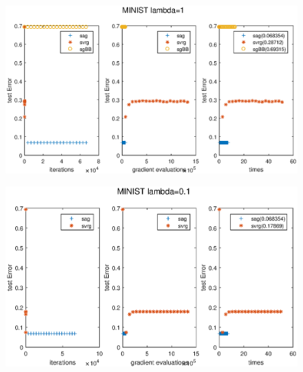 \documentclass[UTF8]{ctexart}
\begin{document}
\begin{figure}[htbp]
\centering\includegraphics[width=5in]{1-1-b.eps}
\label{fig:1-1-b}
\end{figure}

\begin{figure}[htbp]
\centering\includegraphics[width=5in]{1-01-a.eps}
\label{fig:1-0.1-a}
\end{figure}
\end{document}
